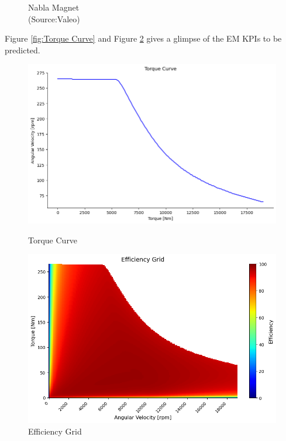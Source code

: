 \documentclass{report} %
\begin{document}
\begin{figure}[H]
\begin{minipage}[b]{0.325\textwidth}
        \caption{\centering Nabla Magnet\\ (Source:Valeo)}
        \label{fig:Nabla Magnet}
    \end{minipage}
\end{figure}

Figure \ref{fig:Torque Curve} and Figure \ref{fig:Efficiency Grid} gives a glimpse of the \ac{EM} \ac{KPI}s to be predicted. \\
\begin{figure}[H]
    \centering
    \begin{minipage}[b]{0.475\textwidth}
        \centering
        \includegraphics[width=\textwidth]{./ReportImages/TorqueCurve.png}
        \caption{Torque Curve} %
        \label{fig:Torque Curve}
    \end{minipage}
    \hfill
    \begin{minipage}[b]{0.475\textwidth}
        \centering
        \includegraphics[width=\textwidth]{./ReportImages/EfficiencyGrid.png}
        \caption{Efficiency Grid}
        \label{fig:Efficiency Grid}
    \end{minipage}
\end{figure}
\end{document}
